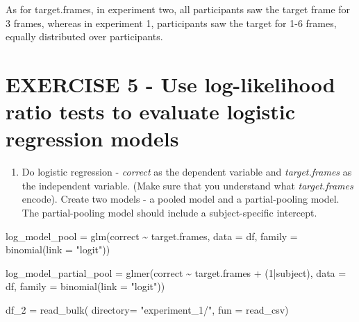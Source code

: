 \documentclass[
]{article}
\newenvironment{Shaded}{\begin{snugshade}}{\end{snugshade}}
\newcommand{\AttributeTok}[1]{\textcolor[rgb]{0.77,0.63,0.00}{#1}}
\newcommand{\DecValTok}[1]{\textcolor[rgb]{0.00,0.00,0.81}{#1}}
\newcommand{\FunctionTok}[1]{\textcolor[rgb]{0.00,0.00,0.00}{#1}}
\newcommand{\NormalTok}[1]{#1}
\newcommand{\OtherTok}[1]{\textcolor[rgb]{0.56,0.35,0.01}{#1}}
\newcommand{\SpecialCharTok}[1]{\textcolor[rgb]{0.00,0.00,0.00}{#1}}
\newcommand{\StringTok}[1]{\textcolor[rgb]{0.31,0.60,0.02}{#1}}
\providecommand{\tightlist}{%
  \setlength{\itemsep}{0pt}\setlength{\parskip}{0pt}}
\begin{document}
As for target.frames, in experiment two, all participants saw the target
frame for 3 frames, whereas in experiment 1, participants saw the target
for 1-6 frames, equally distributed over participants.

\hypertarget{exercise-5---use-log-likelihood-ratio-tests-to-evaluate-logistic-regression-models}{%
\section{EXERCISE 5 - Use log-likelihood ratio tests to evaluate
logistic regression
models}\label{exercise-5---use-log-likelihood-ratio-tests-to-evaluate-logistic-regression-models}}

\begin{enumerate}
\def\labelenumi{\arabic{enumi})}
\tightlist
\item
  Do logistic regression - \emph{correct} as the dependent variable and
  \emph{target.frames} as the independent variable. (Make sure that you
  understand what \emph{target.frames} encode). Create two models - a
  pooled model and a partial-pooling model. The partial-pooling model
  should include a subject-specific intercept.
\end{enumerate}

\begin{Shaded}
\begin{Highlighting}[]
\NormalTok{log\_model\_pool }\OtherTok{=} \FunctionTok{glm}\NormalTok{(correct }\SpecialCharTok{\textasciitilde{}}\NormalTok{ target.frames, }\AttributeTok{data =}\NormalTok{ df, }\AttributeTok{family =} \FunctionTok{binomial}\NormalTok{(}\AttributeTok{link =} \StringTok{"logit"}\NormalTok{))}

\NormalTok{log\_model\_partial\_pool }\OtherTok{=} \FunctionTok{glmer}\NormalTok{(correct }\SpecialCharTok{\textasciitilde{}}\NormalTok{ target.frames }\SpecialCharTok{+}\NormalTok{ (}\DecValTok{1}\SpecialCharTok{|}\NormalTok{subject), }\AttributeTok{data =}\NormalTok{ df, }\AttributeTok{family =} \FunctionTok{binomial}\NormalTok{(}\AttributeTok{link =} \StringTok{"logit"}\NormalTok{))}
\end{Highlighting}
\end{Shaded}

\begin{Shaded}
\begin{Highlighting}[]
\NormalTok{df\_2 }\OtherTok{=} \FunctionTok{read\_bulk}\NormalTok{(}
  \AttributeTok{directory=} \StringTok{"experiment\_1/"}\NormalTok{,}
  \AttributeTok{fun =}\NormalTok{ read\_csv)}
\end{Highlighting}
\end{Shaded}
\end{document}
